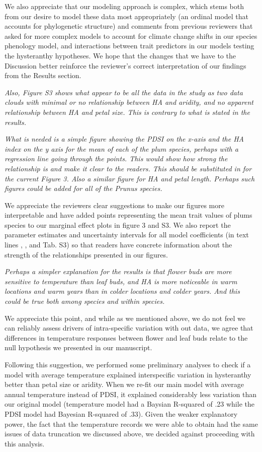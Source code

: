 \documentclass{article}[12pt]
\begin{document}
We also appreciate that our modeling approach is complex, which stems both from our desire to model these data most appropriately (an ordinal model that accounts for phylogenetic structure) and comments from previous reviewers that asked for more complex models to account for climate change shifts in our species phenology model, and interactions between trait predictors in our models testing the hysteranthy hypotheses. We hope that the changes that we have to the Discussion better reinforce the reviewer's correct interpretation of our findings from the Results section.

\emph{Also, Figure S3 shows what appear to be all the data in the study as two data clouds with minimal or no relationship between HA and aridity, and no apparent relationship between HA and petal size.  This is contrary to what is stated in the results.}

\emph{What is needed is a simple figure showing the PDSI on the x-axis and the HA index on the y axis for the mean of each of the plum species, perhaps with a regression line going through the points. This would show how strong the relationship is and make it clear to the readers. This should be substituted in for the current Figure 3.  Also a similar figure for HA and petal length. Perhaps such figures could be added for all of the Prunus species.}

We appreciate the reviewers clear suggestions to make our figures more interpretable and have added points representing the mean trait values of plums species to our marginal effect plots in figure 3 and S3. We also report the parameter estimates and uncertainty intervals for all model coefficients (in text lines , , and Tab. S3) so that readers have concrete information about the strength of the relationships presented in our figures.


\emph{Perhaps a simpler explanation for the results is that flower buds are more sensitive to temperature than leaf buds, and HA is more noticeable in warm locations and warm years than in colder locations and colder years. And this could be true both among species and within species.}

We appreciate this point, and while as we mentioned above, we do not feel we can reliably assess drivers of intra-specific variation with out data, we agree that differences in temperature responses between flower and leaf buds relate to the null hypothesis we presented in our manuscript.

Following this suggestion, we performed some preliminary analyses to check if a model with average temperature explained interspecific variation in hysteranthy better than petal size or aridity. When we re-fit our main model with average annual temperature instead of PDSI, it explained considerably less variation than our original model (temperature model had a Baysian R-squared of .23 while the PDSI model had Bayesian R-squared of .33). Given the weaker explanatory power, the fact that the temperature records we were able to obtain had the same issues of data truncation we discussed above, we decided against proceeding with this analysis.
\end{document}
